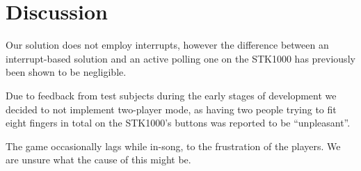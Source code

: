 \section{Discussion}
	Our solution does not employ interrupts, however the difference between an interrupt-based solution and an active polling one on the STK1000 has previously been shown to be negligible\cite{tdt4258-1}.

	Due to feedback from test subjects during the early stages of development we decided to not implement two-player mode, as having two people trying to fit eight fingers in total on the STK1000's buttons was reported to be ``unpleasant''.
	
	The game occasionally lags while in-song, to the frustration of the players.
	We are unsure what the cause of this might be.